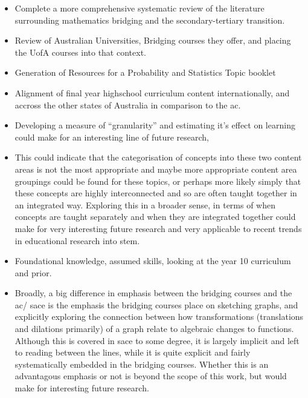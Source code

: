 \documentclass[twoside,12pt,a4paper]{report}
\begin{document}
\begin{itemize}
	\item Complete a more comprehensive systematic review of the literature surrounding mathematics bridging and the secondary-tertiary transition.
	\item Review of Australian Universities, Bridging courses they offer, and placing the UofA courses into that context.
	\item Generation of Resources for a Probability and Statistics Topic booklet
	\item Alignment of final year highschool curriculum content internationally, and accross the other states of Australia in comparison to the \gls{ac}.
\end{itemize}


\begin{itemize}
	\item Developing a measure of ``granularity'' and estimating it's effect on learning could make for an interesting line of future research,
	\item This could indicate that the categorisation of concepts into these two content areas is not the most appropriate and maybe more appropriate content area groupings could be found for these topics, or perhaps more likely simply that these concepts are highly interconnected and so are often taught together in an integrated way. Exploring this in a broader sense, in terms of when concepts are taught separately and when they are integrated together could make for very interesting future research and very applicable to recent trends in educational research into \gls{stem}.
\end{itemize}

\begin{itemize}
	\item Foundational knowledge, assumed skills, looking at the year 10 curriculum and prior.
\end{itemize}

\begin{itemize}
	\item Broadly, a big difference in emphasis between the bridging courses and the \gls{ac}/ \gls{sace} is the emphasis the bridging courses place on sketching graphs, and explicitly exploring the connection between how transformations (translations and dilations primarily) of a graph relate to algebraic changes to functions. Although this is covered in \gls{sace} to some degree, it is largely implicit and left to reading between the lines, while it is quite explicit and fairly systematically embedded in the bridging courses. Whether this is an advantagous emphasis or not is beyond the scope of this work, but would make for interesting future research.
\end{itemize}
\end{document}
